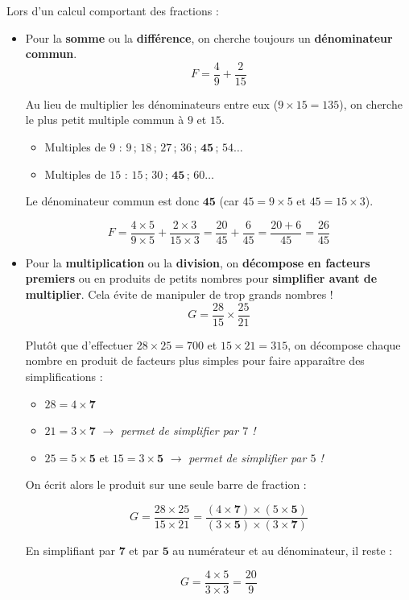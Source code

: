 \begin{meth}
	Lors d'un calcul comportant des fractions :
	\begin{itemize}
		\item Pour la \textbf{somme} ou la \textbf{différence}, on cherche toujours un \textbf{dénominateur commun}.
		      \[
			      F = \frac{4}{9} + \frac{2}{15}
		      \]

		      Au lieu de multiplier les dénominateurs entre eux ($9 \times 15 = 135$), on cherche le plus petit multiple commun à $9$ et $15$.

		      \begin{itemize}
			      \item Multiples de $9$ : $9\,;\, 18\,;\, 27\,;\, 36\,;\, \mathbf{45}\,;\, 54 \dots$
			      \item Multiples de $15$ : $15\,;\, 30\,;\, \mathbf{45}\,;\, 60 \dots$
		      \end{itemize}

		      Le dénominateur commun est donc $\mathbf{45}$ (car $45 = 9 \times 5$ et $45 = 15 \times 3$).

		      \[
			      F = \frac{4 \times 5}{9 \times 5} + \frac{2 \times 3}{15 \times 3} = \frac{20}{45} + \frac{6}{45} = \frac{20 + 6}{45} = \frac{26}{45}
		      \]
		\item Pour la \textbf{multiplication} ou la \textbf{division}, on \textbf{décompose en facteurs premiers} ou en produits de petits nombres pour \textbf{simplifier avant de multiplier}. Cela évite de manipuler de trop grands nombres !
		      \[
			      G = \frac{28}{15} \times \frac{25}{21}
		      \]

		      Plutôt que d'effectuer $28 \times 25 = 700$ et $15 \times 21 = 315$, on décompose chaque nombre en produit de facteurs plus simples pour faire apparaître des simplifications :

		      \begin{itemize}
			      \item $28 = 4 \times \mathbf{7}$
			      \item $21 = 3 \times \mathbf{7}$ \quad $\rightarrow$ \textit{permet de simplifier par $7$ !}
			      \item $25 = 5 \times \mathbf{5}$ et $15 = 3 \times \mathbf{5}$ \quad $\rightarrow$ \textit{permet de simplifier par $5$ !}
		      \end{itemize}

		      On écrit alors le produit sur une seule barre de fraction :

		      \[
			      G = \frac{28 \times 25}{15 \times 21} = \frac{(4 \times \mathbf{7}) \times (5 \times \mathbf{5})}{(3 \times \mathbf{5}) \times (3 \times \mathbf{7})}
		      \]

		      En simplifiant par $\mathbf{7}$ et par $\mathbf{5}$ au numérateur et au dénominateur, il reste :

		      \[
			      G = \frac{4 \times 5}{3 \times 3} = \frac{20}{9}
		      \]
	\end{itemize}
\end{meth}

